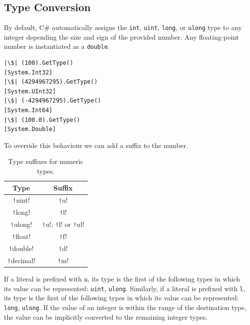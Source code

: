 \documentclass{article}
\begin{document}
\subsection{Type Conversion}
By default, C\# automatically assigns the \texttt{int},
\texttt{uint}, \texttt{long}, or
\texttt{ulong} type to any integer \linebreak depending the
size and sign of the provided number. Any floating-point number is
instantiated as a \texttt{double}.
\begin{verbatim}
|\$| (100).GetType()
[System.Int32]
|\$| (4294967295).GetType()
[System.UInt32]
|\$| (-4294967295).GetType()
[System.Int64]
|\$| (100.0).GetType()
[System.Double]
\end{verbatim}
To override this behaviour we can add a suffix to the number.
\begin{table}[H]
    \centering
    \begin{tabular}{c c}
        \toprule
        \textbf{Type}                & \textbf{Suffix}                                                           \\
        \midrule
        \texttt!uint!    & \texttt!u!                                                    \\
        \texttt!long!    & \texttt!l!                                                    \\
        \texttt!ulong!   & \texttt!u!, \texttt!l! or \texttt!ul! \\
        \midrule
        \texttt!float!   & \texttt!f!                                                    \\
        \texttt!double!  & \texttt!d!                                                    \\
        \texttt!decimal! & \texttt!m!                                                    \\
        \bottomrule
    \end{tabular}
    \caption{Type suffixes for numeric types.}
\end{table}
If a literal is prefixed with \texttt{u}, its type is the first
of the following types in which its value can be represented:
\texttt{uint}, \texttt{ulong}.
Similarly, if a literal is prefixed with \texttt{l}, its type is the first
of the following types in which its value can be represented:
\texttt{long}, \texttt{ulong}.
If the value of an integer is within the range of the destination type,
the value can be implicitly converted to the remaining integer types.
\end{document}
